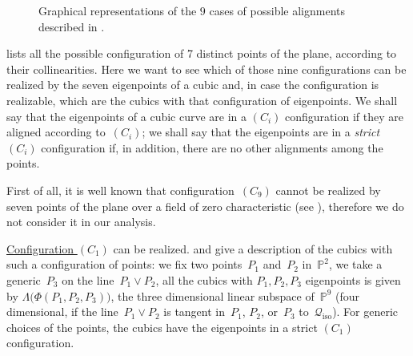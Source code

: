 \documentclass[a4paper, 11pt, reqno]{amsart}
\theoremstyle{plain}
\theoremstyle{definition}
\newcommand{\p}{\mathbb{P}}
\newcommand{\iso}{\mathcal{Q}_{\mathrm{iso}}}
\begin{document}
\begin{figure}[ht]
  \caption{Graphical representations of the $9$ cases of possible alignments described in .}
  \label{figure:all_alignments}
\end{figure}

 lists all the possible configuration
of 7 distinct points of the plane, according to their collinearities. Here
we want to see which of those nine configurations can be realized by
the seven eigenpoints of a cubic and, in case the configuration is
realizable, which are the cubics with that configuration of eigenpoints.
We shall say that the eigenpoints of a cubic curve are in a $(C_i)$ 
configuration if they are aligned according to~$(C_i)$; we shall say 
that the eigenpoints are in a \emph{strict} $(C_i)$ configuration if, 
in addition, there are no other alignments among the points.

First of all, it is well known that configuration~$(C_9)$ cannot be realized
by seven points of the plane over a field of zero
characteristic (see \cite{Whitney1935}), therefore we do not consider
it in our analysis.

\underline{Configuration $(C_1)$} can be realized.  and 
give a description of the cubics with such a configuration of points:
we fix two points~$P_1$ and~$P_2$ in~$\p^2$, we take a generic~$P_3$
on the line~$P_1 \vee P_2$, all the cubics with
$P_1, P_2, P_3$ eigenpoints is given by $\Lambda \bigl( \Phi(P_1, P_2, P_3) \bigr)$, the three
dimensional linear subspace of~$\p^9$ (four dimensional, if the
line~$P_1 \vee P_2$ is tangent in~$P_1$, $P_2$, or~$P_3$ to~$\iso$). For generic choices of the points, the cubics have the eigenpoints in a strict 
$(C_1)$ configuration.
\end{document}
